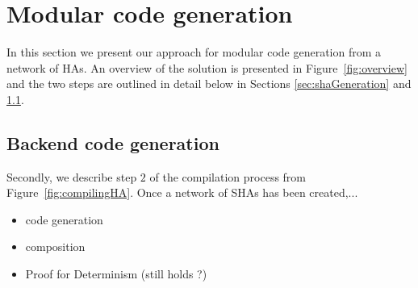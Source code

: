 \section{Modular code generation}
\label{sec:codeGen}

In this section we present our approach for modular code generation from
a network of \acp{HA}. 
An overview of the solution is presented in Figure~\ref{fig:overview} and the two steps are outlined in detail below in Sections \ref{sec:shaGeneration} and \ref{sec:backendCodeGeneration}.



\subsection{Backend code generation}
\label{sec:backendCodeGeneration}

Secondly, we describe step $2$ of the compilation process from Figure~\ref{fig:compilingHA}. Once a network of \acp{SHA} has been created,...

\begin{itemize}
	\item code generation
	\item composition
	\item Proof for Determinism (still holds ?)
\end{itemize}